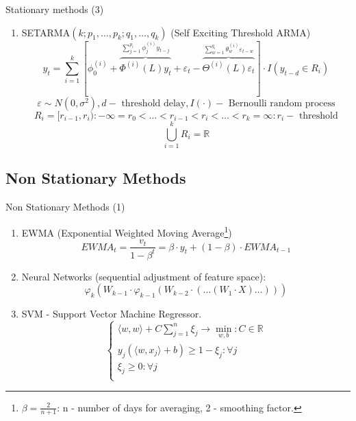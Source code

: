 \documentclass[aspectratio= 169]{beamer}
\newcommand{\R}{\mathbb{R}}
\begin{document}
		\begin{frame}{Stationary methods (3)}
			\begin{enumerate}
				\item SETARMA${(k; p_1, \ldots, p_k; q_1, \ldots, q_k)}$ (Self Exciting Threshold ARMA)
				\begin{equation}
					y_t = \sum_{i = 1}^k \left[\phi_0^{(i)} + \overbrace{\Phi^{(i)}\left(L\right)  y_{t}}^{\sum_{j = 1}^{p_i} \phi_j^{(i)} y_{t - j}} + \varepsilon_t - \overbrace{\Theta^{(i)}\left(L\right)\varepsilon_t}^{\sum_{w = 1}^{q_i} \theta_w^{(i)} \varepsilon_{t - w}}\right] \cdot I\left(y_{t - d} \in R_i\right)
				\end{equation}
				$${\varepsilon \sim N\left(0, \sigma^2\right), d - \text{ threshold delay}, I(\cdot) - \text{ Bernoulli random process}}$$
				$${R_i = [r_{i - 1}, r_i): -\infty = r_0 < \ldots < r_{i - 1} < r_i < \dots < r_k = \infty: r_i - \text{ threshold} }$$
				$${\bigcup_{i = 1}^k R_i = \R}$$
			\end{enumerate}
		\end{frame}
		
		\subsection{Non Stationary Methods}
			\begin{frame}{Non Stationary Methods (1)}
				\begin{enumerate}
					\item EWMA (Exponential Weighted Moving Average\footnote{$\beta = \frac{2}{n + 1}$: n - number of days for averaging, 2 - smoothing factor.})
					\begin{equation}
						EWMA_t = \frac{v_t}{1 - \beta^t} = \beta \cdot y_{t} + (1 - \beta) \cdot EWMA_{t - 1}
					\end{equation}
					
					\item Neural Networks (sequential adjustment of feature space):
					\begin{equation}
						\varphi_k(W_{k - 1} \cdot \varphi_{k - 1}(W_{k - 2} \cdot (\ldots (W_1 \cdot X) \ldots)))
					\end{equation}
					
					\item SVM - Support Vector Machine Regressor.
					\begin{equation}
						\left\{\begin{array}{l}
							\displaystyle
							\langle w, w \rangle + C \sum_{j = 1}^n \xi_j \rightarrow \min_{w, b}: C \in \R\\
							\displaystyle
							y_j(\langle w, x_j \rangle + b) \ge 1 - \xi_j : \forall j\\
							\displaystyle
							\xi_j \ge 0 : \forall j\\
						\end{array}\right.
					\end{equation}
				\end{enumerate}
			\end{frame}
		
\end{document}

